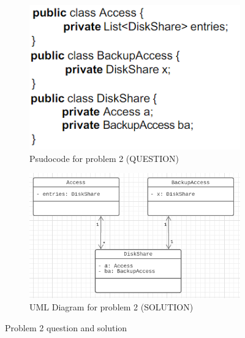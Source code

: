 \documentclass[11pt]{article}
\begin{document}
\begin{figure}[H]
    \centering
    \begin{subfigure}{0.28\textwidth}
		\centering
		\includegraphics[width=\textwidth]{./pics/prob2_prob.png}
		\caption{Psudocode for problem 2 (QUESTION)}
		\label{fig:prob2_prob}
	\end{subfigure}
	\begin{subfigure}{0.7\textwidth}
		\centering
		\includegraphics[width=\textwidth]{./pics/prob2_sol.png}
		\caption{UML Diagram for problem 2 (SOLUTION)}
		\label{fig:prob2_sol}
	\end{subfigure}
    \caption{Problem 2 question and solution}
    \label{fig:prob1}
\end{figure}

\end{document}

